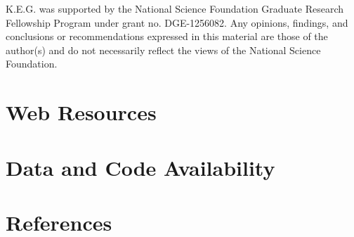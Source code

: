 \documentclass[12pt]{article}
\newcommand{\edit}[1]{{\color{red}{#1}}}
\begin{document}
K.E.G. was supported by the National Science Foundation Graduate Research Fellowship Program under grant no. DGE-1256082. Any opinions, findings, and conclusions or recommendations expressed in this material are those of the author(s) and do not necessarily reflect the views of the National Science Foundation.



\section*{Web Resources}


\edit{GitHub Repository: lists of regions to exclude, code for LD pruning, excluding, and plotting loadings}


\section*{Data and Code Availability}



\newpage
\section*{References}

\end{document}
